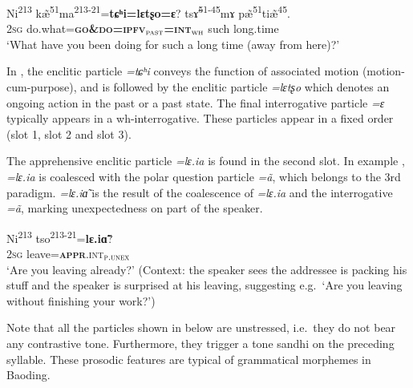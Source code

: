 \documentclass[output=paper,colorlinks,citecolor=brown, language=chinese]{langscibook}
\begin{document}
\ea\label{ex:Song11}
\gll Ni\textsuperscript{213} kæ̃\textsuperscript{51}ma\textsuperscript{213-21}=\textbf{tɕʰi=lɛtʂo=ɛ}? tsɤ̃\textsuperscript{51-45}mɤ pæ̃\textsuperscript{51}tiæ̃\textsuperscript{45}. \\
\textsc{2sg} do.what=\textbf{\textsc{go\&do=ipfv$_{\mathrm{\textsc{past}}}$=int$_{\mathrm{\textsc{wh}}}$}} such long.time\\
\glt `What have you been doing for such a long time (away from here)?'
\z

\noindent In , the enclitic particle \textit{=tɕʰi} conveys the function of associated motion (motion-cum-purpose), and is followed by the enclitic particle \textit{=lɛtʂo} which denotes an ongoing action in the past or a past state. The final interrogative particle \textit{=ɛ} typically appears in a wh-interrogative. These particles appear in a fixed order (slot 1, slot 2 and slot 3).

The apprehensive enclitic particle \textit{=lɛ.ia} is found in the second slot. In example , \textit{=lɛ.ia} is coalesced with the polar question particle \textit{=ã}, which belongs to the 3rd paradigm. \textit{=lɛ.iɑ̃} is the result of the coalescence of \textit{=lɛ.ia} and the interrogative \textit{=ã}, marking unexpectedness on part of the speaker.

\ea\label{ex:Song12}
\gll Ni\textsuperscript{213} tso\textsuperscript{213-21}=\textbf{lɛ.iɑ̃}?  \\
\textsc{2sg} leave=\textsc{\textbf{appr}.int$_{\mathrm{\textsc{p.unex}}}$}\\
\glt `Are you leaving already?' (Context: the speaker sees the addressee is packing his stuff and the speaker is surprised at his leaving, suggesting e.g.\  `Are you leaving without finishing your work?') 
\z

 Note that all the particles shown in  below are unstressed, i.e.\  they do not bear any contrastive tone. Furthermore, they trigger a tone sandhi on the preceding syllable. These prosodic features are typical of grammatical morphemes in Baoding.
\end{document}
